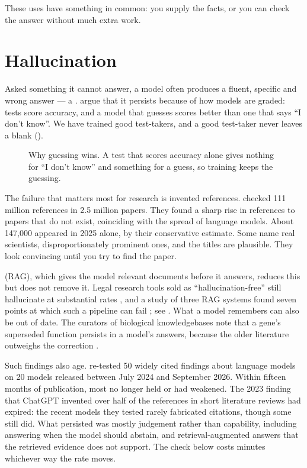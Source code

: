 These uses have something in common: you supply the facts, or you can check
the answer without much extra work.

\section{Hallucination}

Asked something it cannot answer, a model often produces a fluent, specific
and wrong answer --- a . \textcite{kalai2025hallucinate}
argue that it persists because of how models are graded: tests score accuracy, and a model that guesses scores
better than one that says ``I don't know''. We have trained good test-takers,
and a good test-taker never leaves a blank ().

\begin{figure}[htbp]
\centering
{}
\caption{Why guessing wins. A test that scores accuracy alone gives nothing
for ``I don't know'' and something for a guess, so training keeps the
guessing.}
\label{fig:guessing}
\end{figure}

The failure that matters most for research is invented references.
\textcite{zhao2026citations} checked 111 million references in 2.5 million
papers. They found a sharp rise in references to papers that do not exist,
coinciding with the spread of language models. About 147,000 appeared in 2025
alone, by their conservative estimate. Some name real scientists,
disproportionately prominent ones, and the titles are plausible. They look
convincing until you try to find the paper.

 (RAG), which gives the model relevant
documents before it answers, reduces this but does not remove it. Legal research
tools sold as ``hallucination-free'' still hallucinate at substantial rates
\parencite{magesh2025legalrag}, and a study of three RAG systems found seven
points at which such a pipeline can fail \parencite{kurniawan2024ragfailures};
see . What a model remembers can also be out of date.
The curators of biological knowledgebases note that a gene's superseded
function persists in a model's answers, because the older literature
outweighs the correction \parencite{pombase2026curation}.

Such findings also age. \textcite{queen2026shelflife} re-tested 50 widely
cited findings about language models on 20 models released between July 2024
and September 2026. Within fifteen months of publication, most no longer held
or had weakened. The 2023 finding that ChatGPT invented over half of the
references in short literature reviews had expired: the recent models they
tested rarely fabricated citations, though some still did. What persisted was
mostly judgement rather than capability, including answering when the model
should abstain, and retrieval-augmented answers that the retrieved evidence
does not support. The check below costs minutes whichever way the rate moves.

